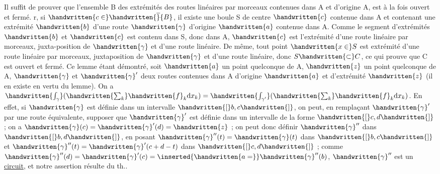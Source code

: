 Il suffit de prouver que l'ensemble B des extrémités des routes linéaires par morceaux contenues dans A et d'origine A, est à la fois ouvert et fermé. r, si $\handwritten{c\in}\handwritten{\overline}{B}$, il existe une boule S de centre $\handwritten{c}$ contenue dans A et contenant une extrémité $\handwritten{b}$ d'une route $\handwritten{\gamma}$ d'origine $\handwritten{a}$ contenue dans A. Comme le segment d'extrémités $\handwritten{b}$ et $\handwritten{c}$ est contenu dans S, donc dans A, $\handwritten{c}$ est l'extrémité d'une route linéaire par morceaux, juxta-position de $\handwritten{\gamma}$ et d'une route linéaire. De même, tout point $\handwritten{x\in}S$ est extrémité d'une route linéaire par morceaux, juxtaposition de $\handwritten{\gamma}$ et d'une route linéaire, donc $S\handwritten{\subset}C$, ce qui prouve que C est ouvert et fermé. Ce lemme étant démontré, soit $\handwritten{a}$ un point quelconque de A, $\handwritten{z}$ un point quelconque de A, $\handwritten{\gamma}$ et $\handwritten{\gamma}'$ deux routes contenues dans A d'origine $\handwritten{a}$ et d'extrémité $\handwritten{z}$ (il en existe en vertu du lemme). On a $\handwritten{\int_\gamma}(\handwritten{\sum_k}\handwritten{f}_k\mathrm{d}x_k)=\handwritten{\int_{\gamma'}}(\handwritten{\sum_k}\handwritten{f}_k\mathrm{d}x_k)$.
En effet, si $\handwritten{\gamma}$ est définie dans un intervalle $\handwritten{[}b,c\handwritten{]}$, on peut, en remplaçant $\handwritten{\gamma}'$ par une route équivalente, supposer que $\handwritten{\gamma}'$ est définie dans un intervalle de la forme $\handwritten{[}c,d\handwritten{]}$ ; on a $\handwritten{\gamma}(c)=\handwritten{\gamma}'(d)=\handwritten{z}$ ; on peut donc définir $\handwritten{\gamma}''$ dans $\handwritten{[}b,d\handwritten{]}$, en posant $\handwritten{\gamma}''(t)=\handwritten{\gamma}(t)$ dans $\handwritten{[}b,c\handwritten{]}$ et $\handwritten{\gamma}''(t)=\handwritten{\gamma}'(c+d-t)$ dans $\handwritten{[}c,d\handwritten{]}$ ; comme $\handwritten{\gamma}''(d)=\handwritten{\gamma}'(c)=\inserted{\handwritten{a=}}\handwritten{\gamma}''(b)$, $\handwritten{\gamma}''$ est un \uline{circuit}, et notre assertion résulte du th..
